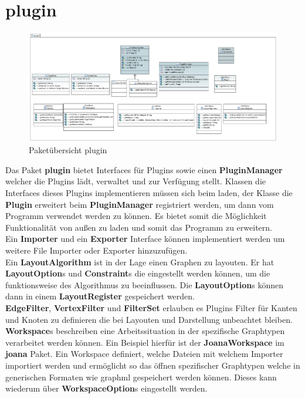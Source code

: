 \newpage

\section{plugin}

\begin{figure}[hb]
  \centering
  \includegraphics[width=380pt]{resourcen/plugin.pdf}
  \caption{Paketübersicht plugin}
  \label{fig:packge_plugin}
\end{figure}

Das Paket \textbf{plugin} bietet Interfaces für Plugins sowie einen \textbf{PluginManager} welcher die Plugins lädt, verwaltet und zur Verfügung stellt. Klassen die Interfaces dieses Plugins implementieren müssen sich beim laden, der Klasse die \textbf{Plugin} erweitert beim \textbf{PluginManager} registriert werden, um dann vom Programm verwendet werden zu können. Es bietet somit die Möglichkeit Funktionalität von außen zu laden und somit das Programm zu erweitern. \\
Ein \textbf{Importer} und ein \textbf{Exporter} Interface können implementiert werden um weitere File Importer oder Exporter hinzuzufügen. \\
Ein \textbf{LayoutAlgorithm} ist in der Lage einen Graphen zu layouten. Er hat \textbf{LayoutOption}s und \textbf{Constraint}s die eingestellt werden können, um die funktionsweise des Algorithmus zu beeinflussen. Die \textbf{LayoutOption}s können dann in einem \textbf{LayoutRegister} gespeichert werden. \\
\textbf{EdgeFilter}, \textbf{VertexFilter} und \textbf{FilterSet} erlauben es Plugins Filter für Kanten und Knoten zu definieren die bei Layouten und Darstellung unbeachtet bleiben. \\
\textbf{Workspace}s beschreiben eine Arbeitssituation in der spezifische Graphtypen verarbeitet werden können. Ein Beispiel hierfür ist der \textbf{JoanaWorkspace} im \textbf{joana} Paket. Ein Workspace definiert, welche Dateien mit welchem Importer importiert werden und ermöglicht so das öffnen spezifischer Graphtypen welche in generischen Formaten wie graphml gespeichert werden können. Dieses kann wiederum über \textbf{WorkspaceOption}s eingestellt werden.\\

